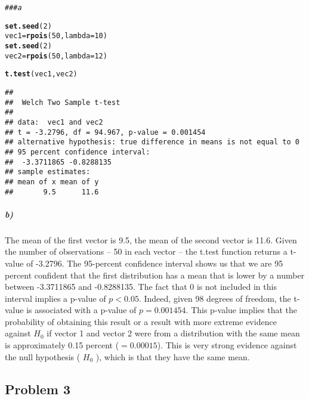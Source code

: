\documentclass[12pt,letter]{article}\usepackage[]{graphicx}\usepackage[]{color}
\makeatletter
\newcommand{\hlnum}[1]{\textcolor[rgb]{0.686,0.059,0.569}{#1}}%
\newcommand{\hlcom}[1]{\textcolor[rgb]{0.678,0.584,0.686}{\textit{#1}}}%
\newcommand{\hlstd}[1]{\textcolor[rgb]{0.345,0.345,0.345}{#1}}%
\newcommand{\hlkwb}[1]{\textcolor[rgb]{0.69,0.353,0.396}{#1}}%
\newcommand{\hlkwc}[1]{\textcolor[rgb]{0.333,0.667,0.333}{#1}}%
\newcommand{\hlkwd}[1]{\textcolor[rgb]{0.737,0.353,0.396}{\textbf{#1}}}%
\newenvironment{kframe}{%
 \def\at@end@of@kframe{}%
 \ifinner\ifhmode%
  \def\at@end@of@kframe{\end{minipage}}%
  \begin{minipage}{\columnwidth}%
 \fi\fi%
 \def\FrameCommand##1{\hskip\@totalleftmargin \hskip-\fboxsep
 \colorbox{shadecolor}{##1}\hskip-\fboxsep
     \hskip-\linewidth \hskip-\@totalleftmargin \hskip\columnwidth}%
 \MakeFramed {\advance\hsize-\width
   \@totalleftmargin\z@ \linewidth\hsize
   \@setminipage}}%
 {\par\unskip\endMakeFramed%
 \at@end@of@kframe}
\newenvironment{knitrout}{}{} %
\makeatother
\begin{document}
\begin{knitrout}
\color{fgcolor}\begin{kframe}
\begin{alltt}
\hlcom{### a}

\hlkwd{set.seed}\hlstd{(}\hlnum{2}\hlstd{)}
\hlstd{vec1} \hlkwb{=} \hlkwd{rpois}\hlstd{(}\hlnum{50}\hlstd{,} \hlkwc{lambda} \hlstd{=} \hlnum{10}\hlstd{)}
\hlkwd{set.seed}\hlstd{(}\hlnum{2}\hlstd{)}
\hlstd{vec2} \hlkwb{=} \hlkwd{rpois}\hlstd{(}\hlnum{50}\hlstd{,} \hlkwc{lambda} \hlstd{=} \hlnum{12}\hlstd{)}

\hlkwd{t.test}\hlstd{(vec1, vec2)}
\end{alltt}
\begin{verbatim}
## 
## 	Welch Two Sample t-test
## 
## data:  vec1 and vec2
## t = -3.2796, df = 94.967, p-value = 0.001454
## alternative hypothesis: true difference in means is not equal to 0
## 95 percent confidence interval:
##  -3.3711865 -0.8288135
## sample estimates:
## mean of x mean of y 
##       9.5      11.6
\end{verbatim}
\end{kframe}
\end{knitrout}

\subparagraph{b)} The mean of the first vector is 9.5, the mean of the second vector is 11.6. Given the number of observations -- 50 in each vector -- the t.test function returns a t-value of -3.2796. The 95-percent confidence interval shows us that we are 95 percent confident that the first distribution has a mean that is lower by a number between -3.3711865 and -0.8288135. The fact that 0 is not included in this interval implies a p-value of $p < 0.05$. Indeed, given 98 degrees of freedom, the t-value is associated with a p-value of $p = 0.001454$. This p-value implies that the probability of obtaining this result or a result with more extreme evidence against $H_0$ if vector 1 and vector 2 were from a distribution with the same mean is approximately 0.15 percent ($= 0.00015$). This is very strong evidence against the null hypothesis ( $H_0$ ), which is that they have the same mean.



\subsection*{Problem 3}
\end{document}
